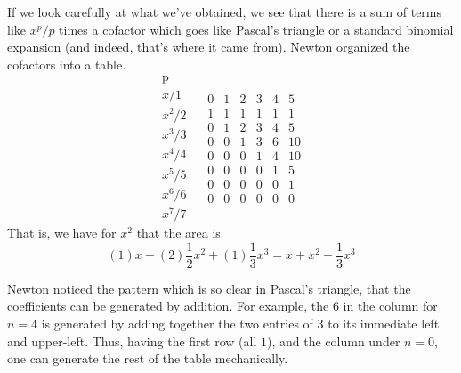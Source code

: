 \documentclass[11pt, oneside]{article}
\begin{document}
If we look carefully at what we've obtained, we see that there is a sum of terms like $x^p/p$ times a cofactor which goes like Pascal's triangle or a standard binomial expansion (and indeed, that's where it came from).  Newton organized the cofactors into a table.
\[
\begin{matrix}
\text{p}  \\
x/1  \\
x^2/2 \\
x^3/3 \\
x^4/4 \\
x^5/5 \\
x^6/6 \\
x^7/7
\end{matrix} \ \ \ \
\begin{matrix}
0 & 1 & 2 & 3 & 4 & 5  \\
1 & 1 & 1 & 1 & 1 & 1  \\
0 & 1 & 2 & 3 & 4 & 5 \\
0 & 0 & 1 & 3 & 6 & 10 \\
0 & 0 & 0 & 1 & 4 & 10 \\
0 & 0 & 0 & 0 & 1 & 5 \\
0 & 0 & 0 & 0 & 0 & 1 \\
0 & 0 & 0 & 0 & 0 & 0
\end{matrix}
\]
\large
That is, we have for $x^2$ that the area is
\[ (1)x + (2)\frac{1}{2}x^2 + (1)\frac{1}{3}x^3 = x + x^2 + \frac{1}{3}x^3 \]

Newton noticed the pattern which is so clear in Pascal's triangle, that the coefficients can be generated by addition.  For example, the $6$ in the column for $n=4$ is generated by adding together the two entries of $3$ to its immediate left and upper-left.  Thus, having the first row (all $1$), and the column under $n=0$, one can generate the rest of the table mechanically.
\end{document}
